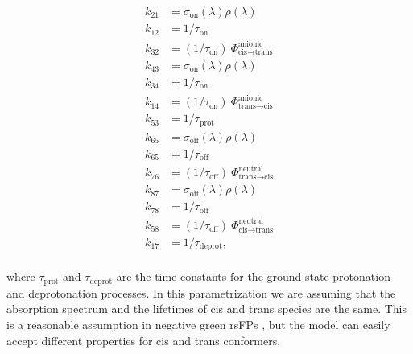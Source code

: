 \documentclass{article}
\begin{document}
\begin{equation}\label{eq:rsFP_k_8states}
    \begin{aligned}
        k_{21} &= \sigma_{\text{on}}(\lambda) \rho(\lambda) \\
        k_{12} &= 1 / \tau_{\text{on}} \\
        k_{32} &= (1 / \tau_{\text{on}}) \ \Phi^{\text{anionic}}_{\text{cis} \rightarrow \text{trans}} \\    
        k_{43} &= \sigma_{\text{on}}(\lambda) \rho(\lambda) \\
        k_{34} &= 1 / \tau_{\text{on}} \\
        k_{14} &= (1 / \tau_{\text{on}}) \ \Phi^{\text{anionic}}_{\text{trans} \rightarrow \text{cis}} \\
        k_{53} &= 1 / \tau_{\text{prot}} \\
        k_{65} &= \sigma_{\text{off}}(\lambda) \rho(\lambda) \\
        k_{65} &= 1/ \tau_{\text{off}} \\
        k_{76} &= (1 / \tau_{\text{off}}) \ \Phi^{\text{neutral}}_{\text{trans} \rightarrow \text{cis}}\\
        k_{87} &= \sigma_{\text{off}}(\lambda) \rho(\lambda) \\
        k_{78} &= 1/ \tau_{\text{off}} \\
        k_{58} &= (1 / \tau_{\text{off}}) \ \Phi^{\text{neutral}}_{\text{cis} \rightarrow \text{trans}}\\
        k_{17} &= 1 / \tau_{\text{deprot}}, \\
    \end{aligned}
\end{equation}

where $\tau_\text{prot}$ and $\tau_\text{deprot}$ are the time constants for the ground state protonation and deprotonation processes.
In this parametrization we are assuming that the absorption spectrum and the lifetimes of cis and trans species are the same. This is a reasonable assumption in negative green rsFPs \cite{Yadav2015b}, but the model can easily accept different properties for cis and trans conformers.
\end{document}
